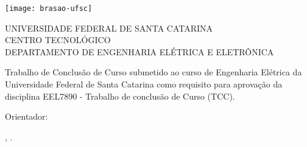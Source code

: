 \begin{titlepage}
  \begin{center}
    \texttt{[image: brasao-ufsc]}
  \end{center}

  \begin{center}
    {\small UNIVERSIDADE FEDERAL DE SANTA CATARINA}\\
    {\small CENTRO TECNOLÓGICO}\\
    {\small DEPARTAMENTO DE ENGENHARIA ELÉTRICA E ELETRÔNICA}
  \end{center}

  \vfill

  \begin{center}
    {\LARGE \thetitle}
  \end{center}

  \vfill

  \begin{center}
    Trabalho de Conclusão de Curso submetido ao curso de Engenharia Elétrica da Universidade Federal de Santa Catarina como requisito para aprovação da disciplina EEL7890 - Trabalho de conclusão de Curso (TCC).
  \end{center}

  \vfill

  \begin{center}
    {\large \theauthor}

    \medskip
    Orientador: \theadvisor\\
  \end{center}

  \vfill

  \begin{center}
    \theplace, \thedate.
  \end{center}
\end{titlepage}

\cleardoublepageempty
